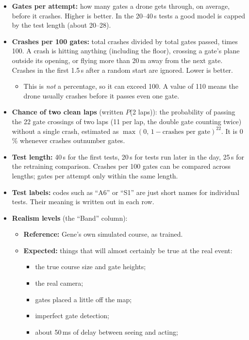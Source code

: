 \documentclass[10pt,a4paper]{article}
\begin{document}
\begin{explain}
\begin{itemize}
\item \textbf{Gates per attempt:} how many gates a drone gets through, on average, before it crashes. Higher is better. In the 20--40\,s tests a good model is capped by the test length (about 20--28).
\item \textbf{Crashes per 100 gates:} total crashes divided by total gates passed, times 100. A crash is hitting anything (including the floor), crossing a gate's plane outside its opening, or flying more than 20\,m away from the next gate. Crashes in the first 1.5\,s after a random start are ignored. Lower is better.
\begin{itemize}
\item This is \emph{not} a percentage, so it can exceed 100. A value of 110 means the drone usually crashes before it passes even one gate.
\end{itemize}
\item \textbf{Chance of two clean laps} (written $P$(2 laps)): the probability of passing the 22 gate crossings of two laps (11 per lap, the double gate counting twice) without a single crash, estimated as $\max(0,\,1-\text{crashes per gate})^{22}$. It is 0\,\% whenever crashes outnumber gates.
\item \textbf{Test length:} 40\,s for the first tests, 20\,s for tests run later in the day, 25\,s for the retraining comparison. Crashes per 100 gates can be compared across lengths; gates per attempt only within the same length.
\item \textbf{Test labels:} codes such as ``A6'' or ``S1'' are just short names for individual tests. Their meaning is written out in each row.
\item \textbf{Realism levels} (the ``Band'' column):
\begin{itemize}
\item \textbf{Reference:} Gene's own simulated course, as trained.
\item \textbf{Expected:} things that will almost certainly be true at the real event:
\begin{itemize}
\item the true course size and gate heights;
\item the real camera;
\item gates placed a little off the map;
\item imperfect gate detection;
\item about 50\,ms of delay between seeing and acting;

\end{itemize}
\end{itemize}
\end{itemize}
\end{explain}
\end{document}
